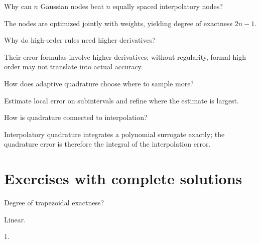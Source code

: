 \begin{problem}\label{prob:ii24-problem-09}
Why can $n$ Gaussian nodes beat $n$ equally spaced interpolatory nodes?
\end{problem}
\begin{solution}
The nodes are optimized jointly with weights, yielding degree of exactness $2n-1$.
\end{solution}

\begin{problem}\label{prob:ii24-problem-10}
Why do high-order rules need higher derivatives?
\end{problem}
\begin{solution}
Their error formulas involve higher derivatives; without regularity, formal high order may not translate into actual accuracy.
\end{solution}

\begin{problem}\label{prob:ii24-problem-11}
How does adaptive quadrature choose where to sample more?
\end{problem}
\begin{solution}
Estimate local error on subintervals and refine where the estimate is largest.
\end{solution}

\begin{problem}\label{prob:ii24-problem-12}
How is quadrature connected to interpolation?
\end{problem}
\begin{solution}
Interpolatory quadrature integrates a polynomial surrogate exactly; the quadrature error is therefore the integral of the interpolation error.
\end{solution}

\section{Exercises with complete solutions}

\begin{exercise}\label{exr:ii24-01}
Degree of trapezoidal exactness?
\end{exercise}
\begin{hint}
Linear.
\end{hint}
\begin{solution}
$1$.
\end{solution}

